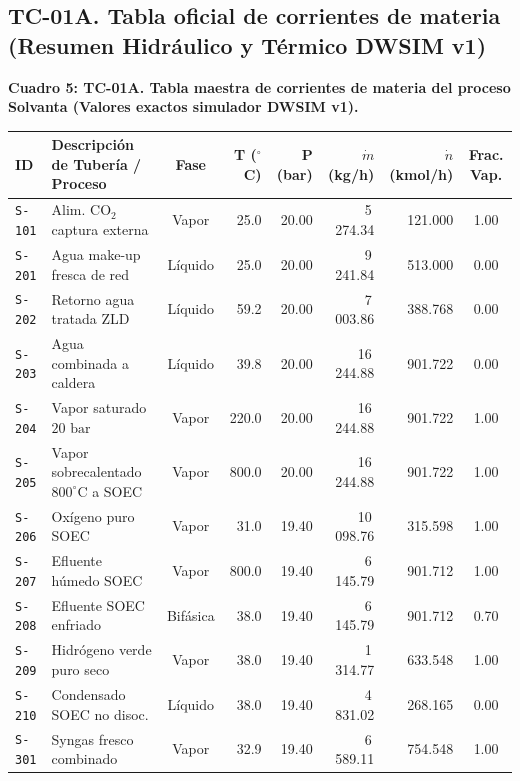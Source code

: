 \documentclass[11pt,letterpaper]{article}
\begin{document}
\clearpage
\begin{landscape}
\subsection{TC-01A. Tabla oficial de corrientes de materia (Resumen Hidráulico y Térmico DWSIM v1)}

\begin{center}
\footnotesize
\setlength{\tabcolsep}{3.2pt}
\renewcommand{\arraystretch}{0.84}
\textbf{Cuadro 5: TC-01A. Tabla maestra de corrientes de materia del proceso Solvanta (Valores exactos simulador DWSIM v1).}\\[2pt]
\begin{tabularx}{\textwidth}{lXcrrrrc}
\toprule
\textbf{ID} & \textbf{Descripción de Tubería / Proceso} & \textbf{Fase} & \textbf{T ($^\circ$C)} & \textbf{P (bar)} & \textbf{$\dot{m}$ (kg/h)} & \textbf{$\dot{n}$ (kmol/h)} & \textbf{Frac. Vap.} \\
\midrule
\texttt{S-101} & Alim. $\text{CO}_2$ captura externa & Vapor & 25.0 & 20.00 & 5\,274.34 & 121.000 & 1.00 \\
\texttt{S-201} & Agua make-up fresca de red & Líquido & 25.0 & 20.00 & 9\,241.84 & 513.000 & 0.00 \\
\texttt{S-202} & Retorno agua tratada ZLD & Líquido & 59.2 & 20.00 & 7\,003.86 & 388.768 & 0.00 \\
\texttt{S-203} & Agua combinada a caldera & Líquido & 39.8 & 20.00 & 16\,244.88 & 901.722 & 0.00 \\
\texttt{S-204} & Vapor saturado $20\text{ bar}$ & Vapor & 220.0 & 20.00 & 16\,244.88 & 901.722 & 1.00 \\
\texttt{S-205} & Vapor sobrecalentado $800^\circ\text{C}$ a SOEC & Vapor & 800.0 & 20.00 & 16\,244.88 & 901.722 & 1.00 \\
\texttt{S-206} & Oxígeno puro SOEC & Vapor & 31.0 & 19.40 & 10\,098.76 & 315.598 & 1.00 \\
\texttt{S-207} & Efluente húmedo SOEC & Vapor & 800.0 & 19.40 & 6\,145.79 & 901.712 & 1.00 \\
\texttt{S-208} & Efluente SOEC enfriado & Bifásica & 38.0 & 19.40 & 6\,145.79 & 901.712 & 0.70 \\
\texttt{S-209} & Hidrógeno verde puro seco & Vapor & 38.0 & 19.40 & 1\,314.77 & 633.548 & 1.00 \\
\texttt{S-210} & Condensado SOEC no disoc. & Líquido & 38.0 & 19.40 & 4\,831.02 & 268.165 & 0.00 \\
\texttt{S-301} & Syngas fresco combinado & Vapor & 32.9 & 19.40 & 6\,589.11 & 754.548 & 1.00 \\

\end{tabularx}
\end{center}
\end{landscape}
\end{document}
